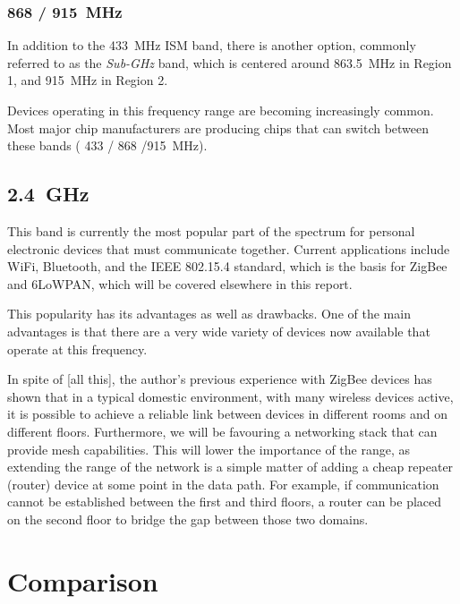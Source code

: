 
\subsubsection{868 / \SI{915}{MHz}}

In addition to the \SI{433}{MHz} \ac{ISM} band, there is another option,
commonly referred to as the \emph{Sub-GHz} band, which is centered around
\SI{863.5}{MHz} in Region 1, and \SI{915}{MHz} in Region 2.

Devices operating in this frequency range are becoming increasingly common. Most
major chip manufacturers are producing chips that can switch between these bands
( 433 / 868 /\SI{915}{MHz}).

\subsection{\SI{2.4}{GHz}}

This band is currently the most popular part of the spectrum for personal
electronic devices that must communicate together. Current applications include
WiFi, Bluetooth, and the IEEE 802.15.4 standard, which is the basis for ZigBee
and \ac{6LoWPAN}, which will be covered elsewhere in this report.

This popularity has its advantages as well as drawbacks. One of the main
advantages is that there are a very wide variety of devices now available that
operate at this frequency. 


In spite of [all this], the author's previous experience with ZigBee devices has
shown that in a typical domestic environment, with many wireless devices active,
it is possible to achieve a reliable link between devices in different rooms and
on different floors. Furthermore, we will be favouring a networking stack that
can provide mesh capabilities. This will lower the importance of the range, as
extending the range of the network is a simple matter of adding a cheap repeater
(router) device at some point in the data path. For example, if communication
cannot be established between the first and third floors, a router can be placed
on the second floor to bridge the gap between those two domains.


\section{Comparison}

